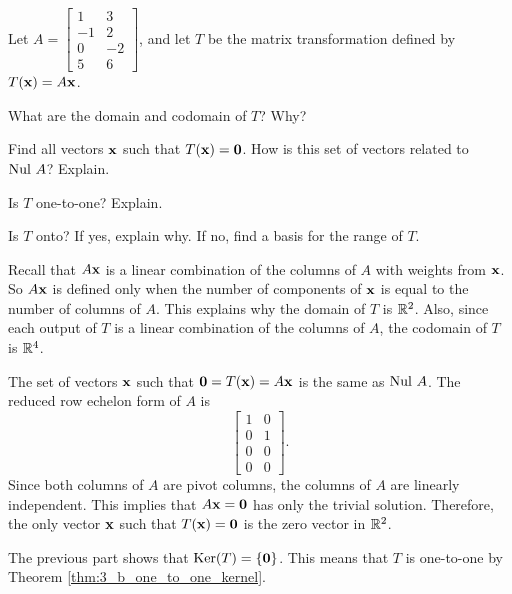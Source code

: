 \begin{example} Let $A = \left[ \begin{array}{rr} 1&3\\-1&2 \\ 0&-2\\5&6 \end{array} \right]$, and let $T$ be the matrix transformation defined by $T(\mathbf{x}) = A\mathbf{x}$.
\ba
\item What are the domain and codomain of $T$? Why? 

\item Find all vectors $\mathbf{x}$ such that $T(\mathbf{x}) = \mathbf{0}$. How is this set of vectors related to $\text{Nul } A$? Explain.

\item Is $T$ one-to-one? Explain.

\item Is $T$ onto? If yes, explain why. If no, find a basis for the range of $T$. 

\ea

\ExampleSolution

\ba
\item Recall that $A \mathbf{x}$ is a linear combination of the columns of $A$ with weights from $\mathbf{x}$. So $A \mathbf{x}$ is defined only when the number of components of $\mathbf{x}$ is equal to the number of columns of $A$. This explains why the domain of $T$ is $\mathbb{R}^2$. Also, since each output of $T$ is a linear combination of the columns of $A$, the codomain of $T$ is $\mathbb{R}^4$. 

\item The set of vectors $\mathbf{x}$ such that $\mathbf{0} = T(\mathbf{x}) = A\mathbf{x}$ is the same as $\text{Nul } A$. The reduced row echelon form of $A$ is 
\[\left[ \begin{array}{cc} 1&0\\0&1\\0&0\\0&0 \end{array}\right].\]
Since both columns of $A$ are pivot columns, the columns of $A$ are linearly independent. This implies that $A \mathbf{x} = \mathbf{0}$ has only the trivial solution. Therefore, the only vector $\mathbf{x}$ such that $T(\mathbf{x}) = \mathbf{0}$ is the zero vector in $\mathbb{R}^2$. 

\item The previous part shows that $\text{Ker}(T) = \{\mathbf{0}\}$. This means that $T$ is one-to-one by Theorem \ref{thm:3_b_one_to_one_kernel}. 


\end{example}
